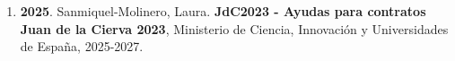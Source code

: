 \begin{enumerate}
\item {\bf 2025}. Sanmiquel-Molinero, Laura. {\bf JdC2023 - Ayudas para contratos Juan de la Cierva 2023}, Ministerio de Ciencia, Innovación y Universidades de España, 2025-2027.\filbreak
\end{enumerate} 
